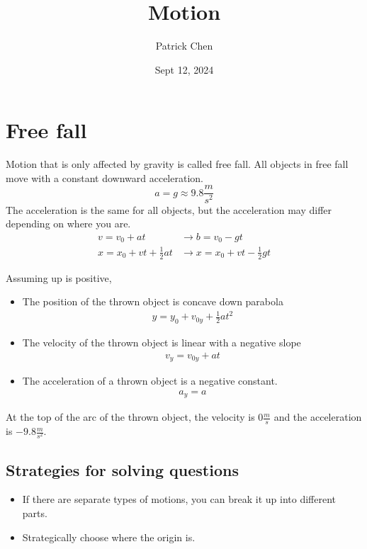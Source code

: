 \documentclass{article}
\title{Motion}
\author{Patrick Chen}
\date{Sept 12, 2024}
\theoremstyle{mytheoremstyle}
\theoremstyle{mytheoremstyle}
\theoremstyle{myproblemstyle}
\begin{document}
    \maketitle
    \section*{Free fall}
    Motion that is only affected by gravity is called free fall. All objects in
    free fall move with a constant downward acceleration.
    \begin{equation*}
        a = g \approx 9.8 \frac{m}{s^2}
    \end{equation*}
    The acceleration is the same for all objects, but the acceleration may
    differ depending on where you are.
    \begin{align*}
        v= v_0 + at &\rightarrow b = v_0 - gt \\
        x = x_0 + vt + \frac{1}{2} at &\rightarrow x = x_0 + vt - \frac{1}{2} gt
    \end{align*}

    Assuming up is positive,
    \begin{itemize}
        \item The position of the thrown object is concave down parabola
            \begin{align*}
                y = y_0 +v_{0y} + \frac{1}{2} at^2
            \end{align*}
        \item The velocity of the thrown object is linear with a negative slope
            \begin{align*}
                v_y = v_{0y} + at
            \end{align*}
        \item The acceleration of a thrown object is a negative constant.
            \begin{align*}
                a_y = a
            \end{align*}
    \end{itemize}

    At the top of the arc of the thrown object, the velocity is $0 \frac{m}{s}$
    and the acceleration is $-9.8 \frac{m}{s^2}$.

    \subsection*{Strategies for solving questions}
    \begin{itemize}
        \item If there are separate types of motions, you can break it up into
            different parts.
        \item Strategically choose where the origin is.
    \end{itemize}
\end{document}
